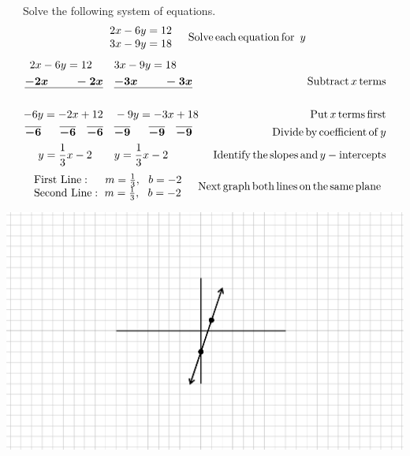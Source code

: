 \vspace{1in}
~\\

\begin{example}~~~Solve the following system of equations.
  \begin{eqnarray*}
    \begin{array}{l}
      2 x - 6 y = 12\\
      3 x - 9 y = 18
    \end{array} &  & \operatorname{Solve} \operatorname{each} \operatorname{equation} \operatorname{for~} y
	\end{eqnarray*}
	\begin{eqnarray*}
    2 x - 6 y = 12~~~ &~~~3 x - 9 y = 18~~ &\\
    \boldsymbol{\underline{- 2 x ~~~~~~~- 2 x}} &~~~ \boldsymbol{\underline{- 3 x ~~~~~~~- 3 x}} &\operatorname{Subtract} x
    \operatorname{terms}\\
		& & \\
    - 6 y = - 2 x + 12 &~~~ - 9 y = - 3 x + 18~ & \operatorname{Put} x \operatorname{terms}
    \operatorname{first}\\
    \boldsymbol{\overline{- 6} ~~~~~ \overline{- 6} ~~~ \overline{- 6}} &~~~ \boldsymbol{\overline{- 9}~~~~~ 
    \overline{- 9} ~~~ \overline{- 9}} & \operatorname{Divide} \operatorname{by}
    \operatorname{coefficient} \operatorname{of} y\\
    y = \frac{1}{3} x - 2~~~ &~~~ y = \displaystyle\frac{1}{3} x - 2 & \operatorname{Identify}
    \operatorname{the} \operatorname{slopes} \operatorname{and} y - \operatorname{intercepts}\\
	\end{eqnarray*}
	\begin{eqnarray*}
    \begin{array}{l}
			\operatorname{First~Line} : ~~~~m = \frac{1}{3}, ~~b = -2\\
      \operatorname{Second~Line} : ~m = \frac{1}{3}, ~~b = - 2
    \end{array} &  & \operatorname{Next} \operatorname{graph} \operatorname{both}
    \operatorname{lines} \operatorname{on} \operatorname{the} \operatorname{same} \operatorname{plane}\\
  \end{eqnarray*}
  \begin{multicols}{2}
    \includegraphics[scale=.85,bb = 115 65 310 190, clip=true]{II_2_1-4.eps}
    

\end{multicols}
\end{example}
